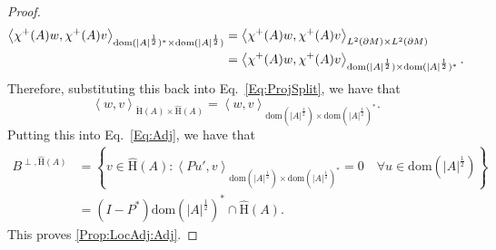 \documentclass[a4paper,10pt,reqno]{amsart}
\newcommand{\dbrac}[1]{\left\{#1\right\}}
\newcommand{\modulus}[1]{|#1|}
\newcommand{\set}[1]{\dbrac{#1}}
\newcommand{\Lp}[2][{}]{{\rm L}^{#2}_{\rm #1}}%
\newcommand{\checkH}{\check{\mathrm{H}}}
\newcommand{\hatH}{\hat{\mathrm{H}}}
\newcommand{\dom}{\mathrm{dom}}
\newcommand{\inprod}[1]{\left\langle #1 \right\rangle}%
\newcommand{\dM}{\partial M}
\theoremstyle{definition}
\begin{document}
\begin{proof}
\begin{align*}
\inprod{ \chi^+(A)w, \chi^+(A)v}_{\dom(\modulus{A}^{\frac12})^\ast  \times \dom(\modulus{A}^{\frac12})}
 & = \inprod{ \chi^+(A)w, \chi^+(A)v}_{\Lp{2}(\dM) \times \Lp{2}(\dM)}                                   \\
 & = \inprod{ \chi^+(A)w, \chi^+(A)v}_{\dom(\modulus{A}^{\frac12})\times \dom(\modulus{A}^{\frac12})^\ast }.
\end{align*}
Therefore, substituting this back into Eq.~\eqref{Eq:ProjSplit}, we have that
$$
\inprod{w,v}_{\checkH(A) \times \hatH(A)} = \inprod{w, v}_{\dom(\modulus{A}^{\frac12})\times \dom(\modulus{A}^{\frac12})^\ast }.
$$
Putting this into Eq.~\eqref{Eq:Adj}, we have that
\begin{align*}
B^{\perp, \hatH(A)}
 & = \set{v \in \hatH(A): \inprod{Pu', v}_{\dom(\modulus{A}^{\frac12})\times \dom(\modulus{A}^{\frac12})^\ast } = 0 \quad \forall u \in \dom(\modulus{A}^{\frac12})} \\
 & = (I - P^\ast)\dom(\modulus{A}^{\frac12})^\ast \cap \hatH(A).
\end{align*}
This proves \ref{Prop:LocAdj:Adj}.


\end{proof}
\end{document}
